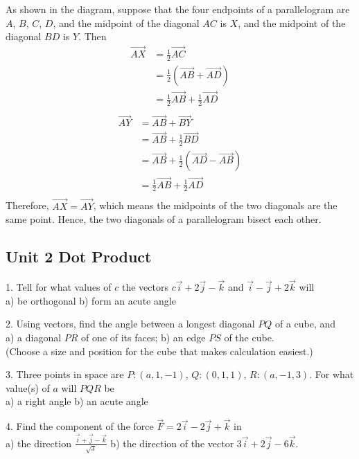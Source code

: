 \documentclass{article}
\begin{document}
As shown in the diagram, suppose that the four endpoints of a parallelogram are 
$A$, $B$, $C$, $D$, and the midpoint of the diagonal $AC$ is $X$, and the 
midpoint of the diagonal $BD$ is $Y$. Then
\[
  \begin{split}
    \vec{AX} &= \frac{1}{2}\vec{AC} \\
             &= \frac{1}{2}(\vec{AB} + \vec{AD}) \\
             &= \frac{1}{2}\vec{AB} + \frac{1}{2}\vec{AD} \\
  \end{split}
\]
\[
  \begin{split}
    \vec{AY} &= \vec{AB} + \vec{BY} \\
             &= \vec{AB} + \frac{1}{2}\vec{BD} \\
             &= \vec{AB} + \frac{1}{2}(\vec{AD} - \vec{AB}) \\
             &= \frac{1}{2}\vec{AB} + \frac{1}{2}\vec{AD} \\
  \end{split}
\]
Therefore, $\vec{AX} = \vec{AY}$, which means the midpoints of the two 
diagonals are the same point. Hence, the two diagonals of a parallelogram 
bisect each other.

\subsection*{Unit 2 Dot Product}

1. Tell for what values of $c$ the vectors $c \vec{i} + 2 \vec{j} - \vec{k}$
and $\vec{i} - \vec{j} + 2 \vec{k}$ will\\
a) be orthogonal \hspace{10px} b) form an acute angle

2. Using vectors, find the angle between a longest diagonal $PQ$ of a cube,
and\\
a) a diagonal $PR$ of one of its faces; \hspace{10px} b) an edge $PS$ of the
cube.\\
(Choose a size and position for the cube that makes calculation easiest.)

3. Three points in space are $P:(a,1,-1)$, $Q:(0,1,1)$, $R:(a,-1,3)$. For what
value(s) of $a$ will $PQR$ be\\
a) a right angle \hspace{10px} b) an acute angle

4. Find the component of the force $\vec{F} = 2 \vec{i} - 2 \vec{j} + \vec{k}$
in\\
a) the direction $\frac{\vec{i} + \vec{j} - \vec{k}}{\sqrt{3}}$ \hspace{10px}
b) the direction of the vector $3 \vec{i} + 2 \vec{j} - 6 \vec{k}$.
\end{document}
